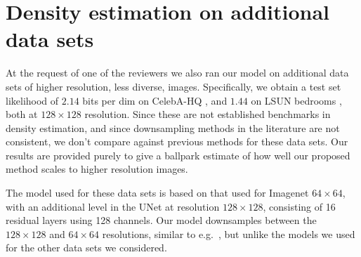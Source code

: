 \documentclass{article}
\begin{document}
\section{Density estimation on additional data sets}
At the request of one of the reviewers we also ran our model on additional data sets of higher resolution, less diverse, images. Specifically, we obtain a test set likelihood of $2.14$ bits per dim on CelebA-HQ \citep{karras2017progressive}, and $1.44$ on LSUN bedrooms \citep{yu2015lsun}, both at $128 \times 128$ resolution. Since these are not established benchmarks in density estimation, and since downsampling methods in the literature are not consistent, we don't compare against previous methods for these data sets. Our results are provided purely to give a ballpark estimate of how well our proposed method scales to higher resolution images.

The model used for these data sets is based on that used for Imagenet $64 \times 64$, with an additional level in the UNet at resolution $128 \times 128$, consisting of 16 residual layers using 128 channels. Our model downsamples between the $128 \times 128$ and $64 \times 64$ resolutions, similar to e.g.\ \cite{ho2020denoising}, but unlike the models we used for the other data sets we considered.

%

%
%
%
%
%
%
%
%
%
%

%
%

%
\end{document}
